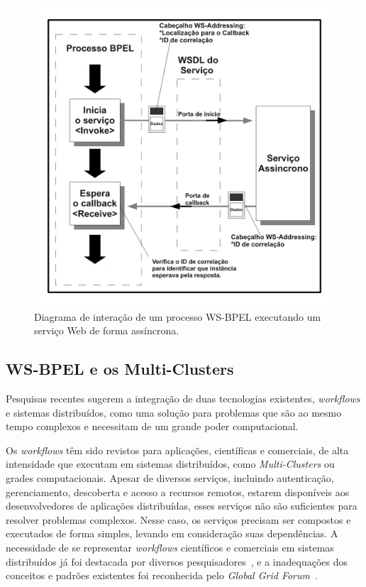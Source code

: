 \documentclass[12pt]{report} %
\begin{document}
		\begin{figure}[!htb]
		\begin{center}
		    \includegraphics[scale=0.50]{imagens/bpelassinc.pdf}
		    \caption{Diagrama de interação de um processo WS-BPEL executando um serviço Web de forma assíncrona.}
		    \label{fig:BPEL-assinc}
		\end{center}
		\end{figure}
		

	\subsection{WS-BPEL e os Multi-Clusters}
	    Pesquisas recentes sugerem a integração de duas tecnologias existentes, \textit{workflows} e sistemas distribuídos, como uma solução para problemas que são ao mesmo tempo complexos e necessitam de um grande poder computacional.

	    Os \textit{workflows} têm sido revistos para aplicações, científicas e comerciais, de alta intensidade que executam em sistemas distribuídos, como \textit{Multi-Clusters} ou grades computacionais.
	    Apesar de diversos serviços, incluindo autenticação, gerenciamento, descoberta e acesso a recursos remotos, estarem disponíveis aos desenvolvedores de aplicações distribuídas, esses serviços não são suficientes para resolver problemas complexos.
	    Nesse caso, os serviços precisam ser compostos e executados de forma simples, levando em consideração suas dependências.
	    A necessidade de se representar \textit{workflows} científicos e comerciais em sistemas distribuídos já foi destacada por diversos pesquisadores~\cite{Laszewski04, Buyya2005}, e a inadequações dos conceitos e padrões existentes foi reconhecida pelo \textit{Global Grid Forum}~\cite{FOX06}.
\end{document}
